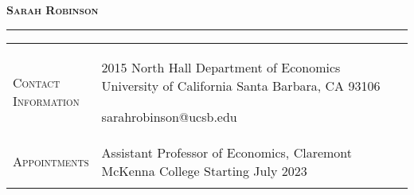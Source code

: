 \documentclass[11pt]{article}
\newcommand{\xspace}{19pt}
\begin{document}
\thispagestyle{firstpage}

\begin{center}
	\vspace*{-15pt}
	{\huge\textsc{\textbf{Sarah Robinson}}} \\[2pt]
\end{center}

\vspace{-6pt}

\noindent\rule{\textwidth}{1pt}

\vspace{3pt}

\begin{tabularx}{\textwidth}{@{}Y Z@{}}
	
	\textsc{Contact \newline Information} & 
	\begin{minipage}[t]{0.38\textwidth}
		2015 North Hall \newline
		Department of Economics \newline
		University of California \newline
		Santa Barbara, CA 93106
	\end{minipage}\begin{minipage}[t]{0.4\textwidth}
	 sarahrobinson@ucsb.edu \newline
	 \href{https://www.s-robinson.com}{\color{blue}{www.s-robinson.com}} 
	\end{minipage}
	\\ \addlinespace[\xspace] 
	
	\textsc{Appointments} &
	Assistant Professor of Economics, Claremont McKenna College \hfill Starting July 2023%
	\\  \addlinespace[\xspace] 
	

\end{tabularx}
\end{document}
